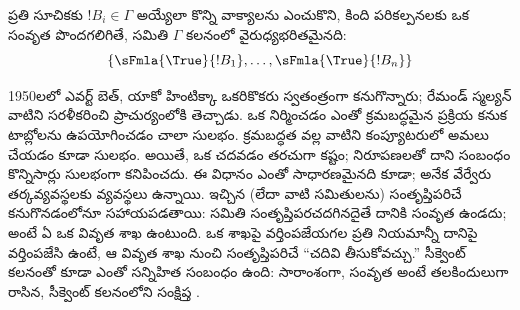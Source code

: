 \documentclass[../../../include/open-logic-section]{subfiles}
\begin{document}
ప్రతి సూచికకు $!B_i \in \Gamma$ అయ్యేలా కొన్ని వాక్యాలను ఎంచుకొని, కింది పరికల్పనలకు ఒక సంవృత
 పొందగలిగితే, సమితి $\Gamma$  కలనంలో
వైరుధ్యభరితమైనది:
\[
\{\sFmla{\True}{!B_1}, \dots, \sFmla{\True}{!B_n}\}
\]

1950లలో ఎవర్ట్ బెత్, యాకో హింటిక్కా ఒకరికొకరు స్వతంత్రంగా
 కనుగొన్నారు; రేమండ్ స్మల్యన్ వాటిని సరళీకరించి
ప్రాచుర్యంలోకి తెచ్చాడు. ఒక  నిర్మించడం ఎంతో
క్రమబద్ధమైన ప్రక్రియ కనుక టాబ్లోలను ఉపయోగించడం చాలా సులభం.
 క్రమబద్ధత వల్ల వాటిని కంప్యూటరులో అమలు చేయడం
కూడా సులభం. అయితే, ఒక  చదవడం తరచుగా కష్టం;
నిరూపణలతో దాని సంబంధం కొన్నిసార్లు సులభంగా కనిపించదు. ఈ విధానం
ఎంతో సాధారణమైనది కూడా; అనేక వేర్వేరు తర్కవ్యవస్థలకు 
వ్యవస్థలు ఉన్నాయి. ఇచ్చిన  (లేదా వాటి సమితులను) సంతృప్తిపరిచే
 కనుగొనడంలోనూ  సహాయపడతాయి: సమితి
సంతృప్తిపరచదగినదైతే దానికి సంవృత  ఉండదు; అంటే ఏ
 ఒక వివృత శాఖ ఉంటుంది. ఒక శాఖపై వర్తింపజేయగల
ప్రతి నియమాన్నీ దానిపై వర్తింపజేసి ఉంటే, ఆ వివృత శాఖ నుంచి
సంతృప్తిపరిచే  “చదివి తీసుకోవచ్చు.” సీక్వెంట్
కలనంతో కూడా ఎంతో సన్నిహిత సంబంధం ఉంది: సారాంశంగా, సంవృత
 అంటే తలకిందులుగా రాసిన, సీక్వెంట్ కలనంలోని సంక్షిప్త
.
\end{document}
